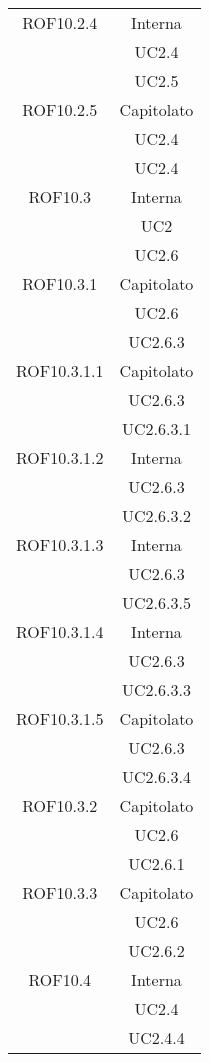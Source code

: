 \begin{longtable}{|c|c|}
\midrule
ROF10.2.4
& Interna\\
& UC2.4\\
& UC2.5
\\

\midrule
ROF10.2.5
& Capitolato\\
& UC2.4\\
& UC2.4
\\

\midrule
ROF10.3
& Interna\\
& UC2\\
& UC2.6
\\

\midrule
ROF10.3.1
& Capitolato\\
& UC2.6\\
& UC2.6.3
\\

\midrule
ROF10.3.1.1
& Capitolato\\
& UC2.6.3\\
& UC2.6.3.1
\\

\midrule
ROF10.3.1.2
& Interna\\
& UC2.6.3\\
& UC2.6.3.2
\\

\midrule
ROF10.3.1.3
& Interna\\
& UC2.6.3\\
& UC2.6.3.5
\\

\midrule
ROF10.3.1.4
& Interna\\
& UC2.6.3\\
& UC2.6.3.3
\\

\midrule
ROF10.3.1.5
& Capitolato\\
& UC2.6.3\\
& UC2.6.3.4
\\

\midrule
ROF10.3.2
& Capitolato\\
& UC2.6\\
& UC2.6.1
\\

\midrule
ROF10.3.3
& Capitolato\\
& UC2.6\\
& UC2.6.2
\\

\midrule
ROF10.4
& Interna\\
& UC2.4\\
& UC2.4.4
\\


\end{longtable}
